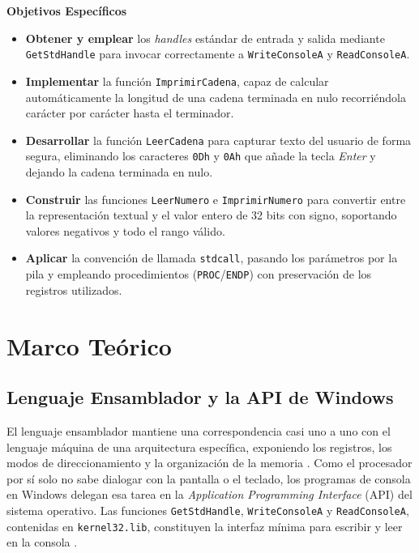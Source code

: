 \documentclass[a4paper,12pt]{article}
\begin{document}
\textbf{Objetivos Específicos}
\begin{itemize}
    \item \textbf{Obtener y emplear} los \textit{handles} estándar de entrada y salida mediante \texttt{GetStdHandle} para invocar correctamente a \texttt{WriteConsoleA} y \texttt{ReadConsoleA}.
    \item \textbf{Implementar} la función \texttt{ImprimirCadena}, capaz de calcular automáticamente la longitud de una cadena terminada en nulo recorriéndola carácter por carácter hasta el terminador.
    \item \textbf{Desarrollar} la función \texttt{LeerCadena} para capturar texto del usuario de forma segura, eliminando los caracteres \texttt{0Dh} y \texttt{0Ah} que añade la tecla \textit{Enter} y dejando la cadena terminada en nulo.
    \item \textbf{Construir} las funciones \texttt{LeerNumero} e \texttt{ImprimirNumero} para convertir entre la representación textual y el valor entero de 32 bits con signo, soportando valores negativos y todo el rango válido.
    \item \textbf{Aplicar} la convención de llamada \texttt{stdcall}, pasando los parámetros por la pila y empleando procedimientos (\texttt{PROC}/\texttt{ENDP}) con preservación de los registros utilizados.
\end{itemize}

\section{Marco Teórico}
\subsection{Lenguaje Ensamblador y la API de Windows}
El lenguaje ensamblador mantiene una correspondencia casi uno a uno con el lenguaje máquina de una arquitectura específica, exponiendo los registros, los modos de direccionamiento y la organización de la memoria \cite{irvine2020assembly}. Como el procesador por sí solo no sabe dialogar con la pantalla o el teclado, los programas de consola en Windows delegan esa tarea en la \textit{Application Programming Interface} (API) del sistema operativo. Las funciones \texttt{GetStdHandle}, \texttt{WriteConsoleA} y \texttt{ReadConsoleA}, contenidas en \texttt{kernel32.lib}, constituyen la interfaz mínima para escribir y leer en la consola \cite{microsoft2023consoleapi}.
\end{document}
